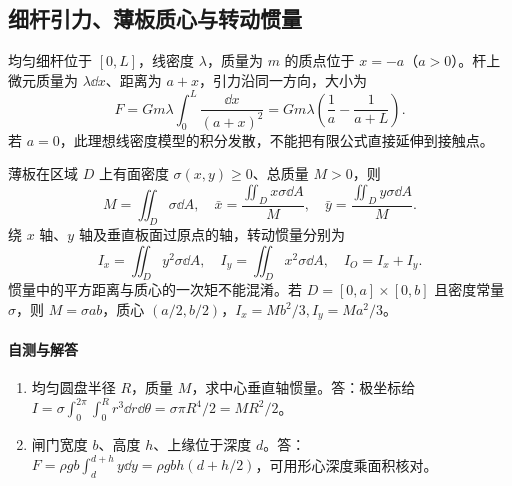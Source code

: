 \subsection{细杆引力、薄板质心与转动惯量}
均匀细杆位于 $[0,L]$，线密度 $\lambda$，质量为 $m$ 的质点位于 $x=-a$（$a>0$）。杆上微元质量为 $\lambda\dd x$、距离为 $a+x$，引力沿同一方向，大小为
\[
 F=Gm\lambda\int_0^L\frac{\dd x}{(a+x)^2}
  =Gm\lambda\left(\frac1a-\frac1{a+L}\right).
\]
若 $a=0$，此理想线密度模型的积分发散，不能把有限公式直接延伸到接触点。

薄板在区域 $D$ 上有面密度 $\sigma(x,y)\ge0$、总质量 $M>0$，则
\[
 M=\iint_D\sigma\dd A,\quad
 \bar x=\frac{\iint_Dx\sigma\dd A}{M},\quad
 \bar y=\frac{\iint_Dy\sigma\dd A}{M}.
\]
绕 $x$ 轴、$y$ 轴及垂直板面过原点的轴，转动惯量分别为
\[
 I_x=\iint_Dy^2\sigma\dd A,\quad
 I_y=\iint_Dx^2\sigma\dd A,\quad I_O=I_x+I_y.
\]
惯量中的平方距离与质心的一次矩不能混淆。若 $D=[0,a]\times[0,b]$ 且密度常量 $\sigma$，则 $M=\sigma ab$，质心 $(a/2,b/2)$，$I_x=Mb^2/3,I_y=Ma^2/3$。

\paragraph{自测与解答}
\begin{enumerate}
\item 均匀圆盘半径 $R$，质量 $M$，求中心垂直轴惯量。答：极坐标给 $I=\sigma\int_0^{2\pi}\int_0^Rr^3\dd r\dd\theta=\sigma\pi R^4/2=MR^2/2$。
\item 闸门宽度 $b$、高度 $h$、上缘位于深度 $d$。答：$F=\rho gb\int_d^{d+h}y\dd y=\rho gbh(d+h/2)$，可用形心深度乘面积核对。
\end{enumerate}
